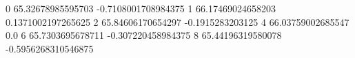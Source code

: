 0 65.32678985595703 -0.7108001708984375
1 66.17469024658203 0.1371002197265625
2 65.84606170654297 -0.1915283203125
4 66.03759002685547 0.0
6 65.7303695678711 -0.307220458984375
8 65.44196319580078 -0.5956268310546875
